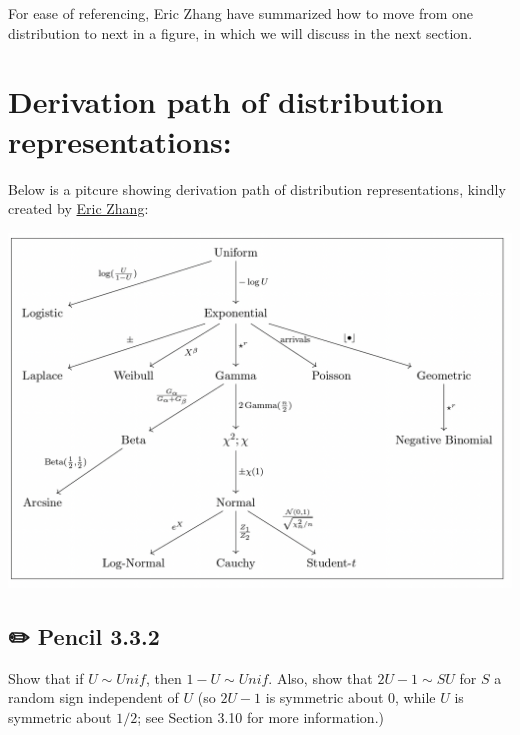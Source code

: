 \documentclass[
  letterpaper,
  DIV=11,
  numbers=noendperiod]{scrreprt}
\theoremstyle{plain}
\theoremstyle{definition}
\theoremstyle{remark}
\begin{document}
For ease of referencing, Eric Zhang have summarized how to move from one
distribution to next in a figure, in which we will discuss in the next
section.

\hypertarget{derivation-path-of-distribution-representations}{%
\section*{Derivation path of distribution
representations:}\label{derivation-path-of-distribution-representations}}


Below is a pitcure showing derivation path of distribution
representations, kindly created by
\href{https://www.ekzhang.com/assets/pdf/Stat_210_Notes.pdf}{Eric
Zhang}:

\includegraphics{./assets/img/derivation.png}

\hypertarget{pencil-3.3.2}{%
\subsection*{✏️ Pencil 3.3.2}\label{pencil-3.3.2}}

Show that if \(U\sim Unif\), then \(1-U \sim Unif\). Also, show that
\(2U-1 \sim SU\) for \(S\) a random sign independent of \(U\) (so
\(2U-1\) is symmetric about 0, while \(U\) is symmetric about \(1/2\);
see Section 3.10 for more information.)
\end{document}
